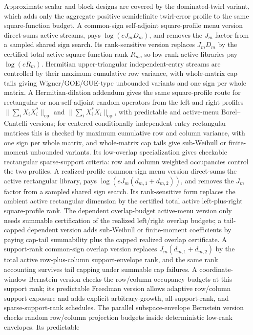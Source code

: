 \documentclass[11pt]{article}
\begin{document}
Approximate scalar and block designs are covered by the dominated-twirl
variant, which adds only the aggregate positive semidefinite twirl-error
profile to the same square-function budget.  A common-sign self-adjoint
square-profile menu version direct-sums active streams, pays
\(\log(eJ_mD_m)\), and removes the \(J_m\) factor from a sampled shared sign
search.  Its rank-sensitive version replaces \(J_mD_m\) by the certified total
active square-function rank \(R_m\), so low-rank active libraries pay
\(\log(eR_m)\).  Hermitian upper-triangular
independent-entry streams are controlled by their maximum cumulative row
variance, with whole-matrix cap tails giving Wigner/GOE/GUE-type unbounded
variants and one sign per whole matrix.  A Hermitian-dilation addendum gives
the same square-profile route for rectangular or non-self-adjoint random
operators from the left and right profiles
\(\|\sum_iX_iX_i^*\|_{\mathrm{op}}\) and
\(\|\sum_iX_i^*X_i\|_{\mathrm{op}}\), with predictable and active-menu
Borel--Cantelli versions; for centered conditionally independent-entry
rectangular matrices this is checked by maximum cumulative row and column
variance, with one sign per whole matrix, and whole-matrix cap tails give
sub-Weibull or finite-moment unbounded variants.  Its low-overlap specialization
gives checkable rectangular sparse-support criteria: row and column weighted
occupancies control the two profiles.  A realized-profile common-sign menu
version direct-sums the active rectangular library, pays
\(\log(eJ_m(d_{m,1}+d_{m,2}))\), and removes the \(J_m\) factor from a sampled
shared sign search.  Its rank-sensitive form replaces the ambient active
rectangular dimension by the certified total active left-plus-right
square-profile rank.  The dependent overlap-budget active-menu version only
needs summable certification of the realized left/right overlap budgets; a
tail-capped dependent version adds sub-Weibull or finite-moment coefficients by
paying cap-tail summability plus the capped realized overlap certificate.  A
support-rank common-sign overlap version replaces \(J_m(d_{m,1}+d_{m,2})\) by
the total active row-plus-column support-envelope rank, and the same rank
accounting survives tail capping under summable cap failures.  A coordinate-window
Bernstein version checks the row/column occupancy budgets at this support rank;
its predictable Freedman version allows adaptive row/column support exposure and
adds explicit arbitrary-growth, all-support-rank, and sparse-support-rank
schedules.
The parallel subspace-envelope Bernstein version checks random row/column
projection budgets inside deterministic low-rank envelopes.  Its predictable
\end{document}
